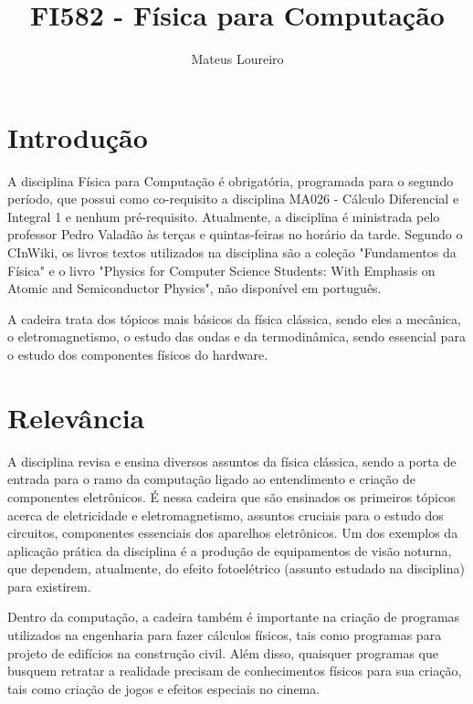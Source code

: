 \documentclass[a4paper]{article}
\title{FI582 - Física para Computação}
\author{Mateus Loureiro}
\begin{document}
\maketitle

\section{Introdução}

A disciplina Física para Computação é obrigatória, programada para o segundo período, que possui como co-requisito a disciplina MA026 - Cálculo Diferencial e Integral 1 e nenhum pré-requisito. Atualmente, a disciplina é ministrada pelo professor Pedro Valadão\cite{SiteSecGrad} às terças e quintas-feiras no horário da tarde. Segundo o CInWiki\cite{CInWiki:FC}, os livros textos utilizados na disciplina são a coleção "Fundamentos da Física"\cite{halliday2010fundamentals} e o livro "Physics for Computer Science Students: With Emphasis on Atomic and Semiconductor Physics"\cite{garcia1998physics}, não disponível em português.

A cadeira trata dos tópicos mais básicos da física clássica, sendo eles a mecânica, o eletromagnetismo, o estudo das ondas e da termodinâmica, sendo essencial para o estudo dos componentes físicos do hardware.

\section{Relevância}

A disciplina revisa e ensina diversos assuntos da física clássica, sendo a porta de entrada para o ramo da computação ligado ao entendimento e criação de componentes eletrônicos. É nessa cadeira que são ensinados os primeiros tópicos acerca de eletricidade e eletromagnetismo, assuntos cruciais para o estudo dos circuitos, componentes essenciais dos aparelhos eletrônicos. Um dos exemplos da aplicação prática da disciplina é a produção de equipamentos de visão noturna, que dependem, atualmente, do efeito fotoelétrico (assunto estudado na disciplina) para existirem\cite{EfeitoFotoeletrico:Wiki}.

Dentro da computação, a cadeira também é importante na criação de programas utilizados na engenharia para fazer cálculos físicos, tais como programas para projeto de edifícios na construção civil. Além disso, quaisquer programas que busquem retratar a realidade precisam de conhecimentos físicos para sua criação, tais como criação de jogos e efeitos especiais no cinema.
\end{document}
